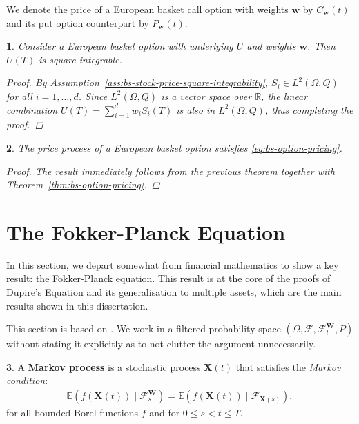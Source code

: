 \documentclass[english]{article}
\numberwithin{equation}{section}
\numberwithin{figure}{section}
\theoremstyle{bolddescit}
\newtheorem{theorem}{\protect\theoremname}[section]
\theoremstyle{definition}
\newtheorem{definition}[theorem]{\protect\definitionname}
\theoremstyle{definition}
\theoremstyle{plain}
\theoremstyle{plain}
\newtheorem{corollary}[theorem]{\protect\corollaryname}
\theoremstyle{bolddesc}
\theoremstyle{plain}
\theoremstyle{remark}
\providecommand{\corollaryname}{Corollary}
\providecommand{\definitionname}{Definition}
\providecommand{\theoremname}{Theorem}
\begin{document}
We denote the price of a European basket call option with weights $\mathbf{w}$ by $C_\mathbf{w}(t)$ and its put option counterpart by $P_\mathbf{w}(t)$.

\begin{theorem}
  Consider a European basket option with underlying $U$ and weights $\mathbf{w}$. Then $U(T)$ is square-integrable.

  \begin{proof}
    By Assumption~\ref{ass:bs-stock-price-square-integrability}, $S_i \in L^2(\Omega, Q)$ for all $i=1,\ldots,d$. Since $L^2(\Omega, Q)$ is a vector space over $\mathbb{R}$, the linear combination $U(T) = \sum_{i=1}^{d} w_i S_i(T)$ is also in $L^2(\Omega, Q)$, thus completing the proof.
  \end{proof}
\end{theorem}

\begin{corollary}
  The price process of a European basket option satisfies \eqref{eq:bs-option-pricing}.

  \begin{proof}
    The result immediately follows from the previous theorem together with Theorem~\ref{thm:bs-option-pricing}.
  \end{proof}
\end{corollary}

\section{The Fokker-Planck Equation}\label{sec:fokker-planck}

In this section, we depart somewhat from financial mathematics to show a key result: the Fokker-Planck equation. This result is at the core of the proofs of Dupire's Equation and its generalisation to multiple assets, which are the main results shown in this dissertation.

This section is based on \textcite{pavliotis_stochastic_2014}. We work in a filtered probability space $(\Omega, \mathcal{F}, \mathcal{F}^\mathbf{W}_t, P)$ without stating it explicitly as to not clutter the argument unnecessarily.

\begin{definition}
  A \textbf{Markov process} is a stochastic process $\mathbf{X}(t)$ that satisfies the \textit{Markov condition}:
  \begin{align*}
    \mathbb{E}(f(\mathbf{X}(t)) \mid \mathcal{F}^\mathbf{W}_{s})
    = \mathbb{E}(f(\mathbf{X}(t)) \mid \mathcal{F}_{\mathbf{X}(s)}),
  \end{align*}
  for all bounded Borel functions $f$ and for $0 \le s < t \le T$.
\end{definition}
\end{document}

